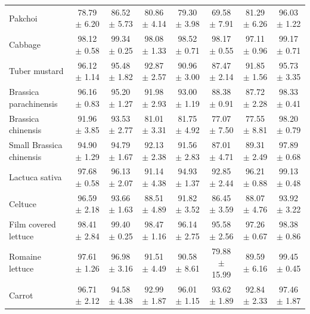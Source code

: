\begin{table}[htbp]
{\begin{tabular}{l c c c c c c c}
    Pakchoi & 78.79 $\pm$ 6.20 & \textcolor{tgblue}{86.52 $\pm$ 5.73} & 80.86 $\pm$ 4.14 & 79.30 $\pm$ 3.98 & 69.58 $\pm$ 7.91 & \textcolor{tgred}{81.29 $\pm$ 6.26} & \textcolor{tgteal}{96.03 $\pm$ 1.22} \\
    Cabbage & 98.12 $\pm$ 0.58 & \textcolor{tgteal}{99.34 $\pm$ 0.25} & 98.08 $\pm$ 1.33 & \textcolor{tgred}{98.52 $\pm$ 0.71} & 98.17 $\pm$ 0.55 & 97.11 $\pm$ 0.96 & \textcolor{tgblue}{99.17 $\pm$ 0.71} \\
    Tuber mustard & \textcolor{tgteal}{96.12 $\pm$ 1.14} & \textcolor{tgred}{95.48 $\pm$ 1.82} & 92.87 $\pm$ 2.57 & 90.96 $\pm$ 3.00 & 87.47 $\pm$ 2.14 & 91.85 $\pm$ 1.56 & \textcolor{tgblue}{95.73 $\pm$ 3.35} \\
    Brassica parachinensis & \textcolor{tgblue}{96.16 $\pm$ 0.83} & \textcolor{tgred}{95.20 $\pm$ 1.27} & 91.98 $\pm$ 2.93 & 93.00 $\pm$ 1.19 & 88.38 $\pm$ 0.91 & 87.72 $\pm$ 2.28 & \textcolor{tgteal}{98.33 $\pm$ 0.41} \\
    Brassica chinensis & \textcolor{tgred}{91.96 $\pm$ 3.85} & \textcolor{tgblue}{93.53 $\pm$ 2.77} & 81.01 $\pm$ 3.31 & 81.75 $\pm$ 4.92 & 77.07 $\pm$ 7.50 & 77.55 $\pm$ 8.81 & \textcolor{tgteal}{98.20 $\pm$ 0.79} \\
    Small Brassica chinensis & \textcolor{tgblue}{94.90 $\pm$ 1.29} & \textcolor{tgred}{94.79 $\pm$ 1.67} & 92.13 $\pm$ 2.38 & 91.56 $\pm$ 2.83 & 87.01 $\pm$ 4.71 & 89.31 $\pm$ 2.49 & \textcolor{tgteal}{97.89 $\pm$ 0.68} \\
    Lactuca sativa & \textcolor{tgblue}{97.68 $\pm$ 0.58} & 96.13 $\pm$ 2.07 & 91.14 $\pm$ 4.38 & 94.93 $\pm$ 1.37 & 92.85 $\pm$ 2.44 & \textcolor{tgred}{96.21 $\pm$ 0.88} & \textcolor{tgteal}{99.13 $\pm$ 0.48} \\
    Celtuce & \textcolor{tgteal}{96.59 $\pm$ 2.18} & \textcolor{tgred}{93.66 $\pm$ 1.63} & 88.51 $\pm$ 4.89 & 91.82 $\pm$ 3.52 & 86.45 $\pm$ 3.59 & 88.07 $\pm$ 4.76 & \textcolor{tgblue}{93.92 $\pm$ 3.22} \\
    Film covered lettuce & \textcolor{tgred}{98.41 $\pm$ 2.84} & \textcolor{tgteal}{99.40 $\pm$ 0.25} & \textcolor{tgblue}{98.47 $\pm$ 1.16} & 96.14 $\pm$ 2.75 & 95.58 $\pm$ 2.56 & 97.26 $\pm$ 0.67 & 98.38 $\pm$ 0.86 \\
    Romaine lettuce & \textcolor{tgblue}{97.61 $\pm$ 1.26} & \textcolor{tgred}{96.98 $\pm$ 3.16} & 91.51 $\pm$ 4.49 & 90.58 $\pm$ 8.61 & 79.88 $\pm$ 15.99 & 89.59 $\pm$ 6.16 & \textcolor{tgteal}{99.45 $\pm$ 0.45} \\
    Carrot & \textcolor{tgblue}{96.71 $\pm$ 2.12} & 94.58 $\pm$ 4.38 & 92.99 $\pm$ 1.87 & \textcolor{tgred}{96.01 $\pm$ 1.15} & 93.62 $\pm$ 1.89 & 92.84 $\pm$ 2.33 & \textcolor{tgteal}{97.46 $\pm$ 1.87} \\

\end{tabular}}
\end{table}
